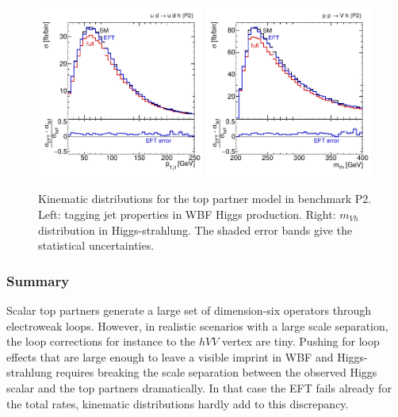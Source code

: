 \begin{figure}
  \includegraphics[width=0.49\textwidth,clip=true,trim=0 0.2cm 0 0.2cm]{fig/validity/TopPartners_WBF.pdf}%
  \includegraphics[width=0.49\textwidth,clip=true,trim=0 0.2cm 0 0.2cm]{fig/validity/TopPartners_VH.pdf}%
  \caption[Kinematic distributions in the top partner model]{Kinematic
    distributions for the top partner model in benchmark P2.  Left:
    tagging jet properties in WBF Higgs production.  Right: $m_{Vh}$
    distribution in Higgs-strahlung. The shaded error bands give the
    statistical uncertainties.}
  \label{fig:validity_partners_distributions}
\end{figure}



\subsubsection{Summary}

Scalar top partners generate a large set of dimension-six operators
through electroweak loops. However, in realistic scenarios with a
large scale separation, the loop corrections for instance to the $hVV$
vertex are tiny.  Pushing for loop effects that are large enough to
leave a visible imprint in WBF and Higgs-strahlung requires breaking
the scale separation between the observed Higgs scalar and the top
partners dramatically. In that case the EFT fails already for the
total rates, kinematic distributions hardly add to this discrepancy.




